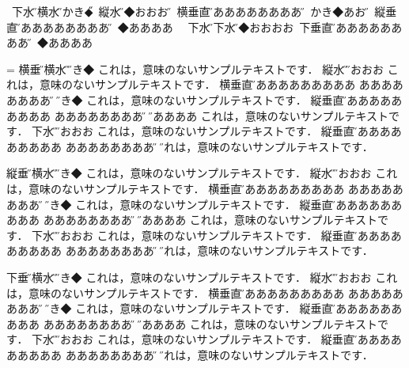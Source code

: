 \vfill\eject

\leavevmode
\hbox{\dtou
下水平\H\vrule\hbox{\yoko 横水平\H }\vrule かき◆\H\vrule
\hbox{\tate 縦水平\H }\vrule ◆おおおお\H\vrule
\vbox{\yoko\hsize=30mm 横垂直\H ああああああああああ\hfill\H}%
\vrule かき◆あおう\H\vrule
\vbox{\tate\hsize=30mm 縦垂直\H ああああああああああ\hfill\H}%
\vrule ◆ああああ
}
\hbox{\dtou
下水平\H\vrule\hbox{\dtou 下水平\H }\vrule◆おおおお\vrule
\vbox{\dtou\hsize=30mm 下垂直\H ああああああああああ\hfill\H}%
\vrule ◆ああああ}


\vfill\eject


=\vbox{\yoko\hsize=100mm
横垂直\H\vrule \hbox{\yoko 横水平\H }\vrule\H かき◆
これは，意味のないサンプルテキストです．
\vrule\hbox{\tate 縦水平\H }\vrule\H おおおお
これは，意味のないサンプルテキストです．\vrule
\vbox{\yoko\hsize=50mm 横垂直\H ああああああああああ%
  あああああああああ\hfill\H}%
\vrule\H かき◆
これは，意味のないサンプルテキストです．\vrule
\vbox{\tate\hsize=50mm 縦垂直\H ああああああああああ%
  あああああああああ\hfill\H}%
\vrule\H ◆ああああ
これは，意味のないサンプルテキストです．\vrule
\hbox{\dtou 下水平\H }\vrule\H おおおお
これは，意味のないサンプルテキストです．
\vrule\vbox{\dtou\hsize=50mm 縦垂直\H ああああああああああ%
  あああああああああ\hfill\H}%
\vrule\H これは，意味のないサンプルテキストです．
}
\vfill\eject

\vbox{\tate\hsize=100mm
縦垂直\H\vrule\hbox{\yoko 横水平\H }\vrule\H かき◆
これは，意味のないサンプルテキストです．
\vrule\hbox{\tate 縦水平\H }\vrule\H おおおお
これは，意味のないサンプルテキストです．\vrule
\vbox{\yoko\hsize=50mm 横垂直\H ああああああああああ%
  あああああああああ\hfill\H}%
\vrule\H かき◆
これは，意味のないサンプルテキストです．\vrule
\vbox{\tate\hsize=50mm 縦垂直\H ああああああああああ%
  あああああああああ\hfill\H}%
\vrule\H ◆ああああ
これは，意味のないサンプルテキストです．\vrule
\hbox{\dtou 下水平\H }\vrule\H おおおお
これは，意味のないサンプルテキストです．
\vrule\vbox{\dtou\hsize=50mm 縦垂直\H ああああああああああ%
  あああああああああ\hfill\H}%
\vrule\H これは，意味のないサンプルテキストです．
}
\vfill\eject

\vbox{\dtou\hsize=100mm
下垂直\H\vrule\hbox{\yoko 横水平\H }\vrule\H かき◆
これは，意味のないサンプルテキストです．
\vrule\hbox{\tate 縦水平\H }\vrule\H おおおお
これは，意味のないサンプルテキストです．\vrule
\vbox{\yoko\hsize=50mm 横垂直\H ああああああああああ%
  あああああああああ\hfill\H}%
\vrule\H かき◆
これは，意味のないサンプルテキストです．\vrule
\vbox{\tate\hsize=50mm 縦垂直\H ああああああああああ%
  あああああああああ\hfill\H}%
\vrule\H ◆ああああ
これは，意味のないサンプルテキストです．\vrule
\hbox{\dtou 下水平\H }\vrule\H おおおお
これは，意味のないサンプルテキストです．
\vrule\vbox{\dtou\hsize=50mm 縦垂直\H ああああああああああ%
  あああああああああ\hfill\H}%
\vrule\H これは，意味のないサンプルテキストです．
}


